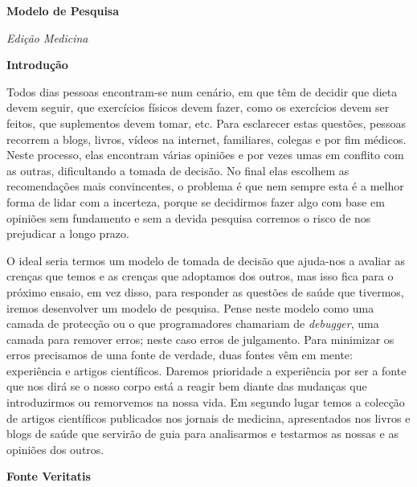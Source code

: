 \documentclass[12pt]{article}
\begin{document}
 

\begin{titlepage}
    \begin{center}
        \Huge\textbf{Modelo de Pesquisa}
         
        \Large\textit{Edi\c c\~ao Medicina}
         
        \vspace{10cm}
    \end{center}
\end{titlepage}

\begin{center}
    \Huge\textbf{Introdu\c c\~ao}
\end{center}

\justifying
Todos dias pessoas encontram-se num cen\'ario, em que t\^em de decidir que
dieta devem seguir, que exerc\'icios f\'isicos devem fazer, como os
exerc\'icios devem ser
feitos,  que suplementos
devem tomar, etc. Para esclarecer estas quest\~oes, pessoas recorrem a blogs,
livros, v\'ideos na internet, familiares, colegas e por fim  m\'edicos. Neste
processo, elas encontram v\'arias
opini\~oes e por vezes umas em conflito com as outras, dificultando a tomada
de decis\~ao. 
No final elas escolhem as recomenda\c c\~oes mais
convincentes, o problema \'e que nem sempre esta \'e a melhor forma de lidar
com a incerteza, porque se decidirmos fazer algo com base em opini\~oes
sem fundamento e sem a devida pesquisa corremos o risco de nos prejudicar a longo prazo. 

O ideal seria termos um modelo de tomada de decis\~ao que ajuda-nos a avaliar as
cren\c cas que temos e as cren\c cas que adoptamos dos outros, mas isso fica
para o pr\'oximo ensaio, em vez disso, para responder as quest\~oes de sa\'ude que
tivermos, iremos desenvolver um modelo de pesquisa.  
Pense neste modelo como  uma camada de protec\c c\~ao ou o que programadores chamariam de \textit{debugger}, uma camada para remover erros; neste caso erros de julgamento.  
Para minimizar os erros precisamos de uma fonte de verdade, duas fontes v\^em
em mente: experi\^encia e artigos cient\'ificos. Daremos prioridade a
experi\^encia por ser a fonte que nos dir\'a se o nosso corpo est\'a a reagir
bem diante das mudan\c cas que introduzirmos ou remorvemos na nossa
vida. Em segundo lugar temos a colec\c c\~ao de artigos cient\'ificos
publicados nos jornais de medicina, apresentados nos livros e blogs de sa\'ude que servir\~ao de
guia para analisarmos e testarmos as nossas e as opini\~oes dos outros. 
\pagebreak


\begin{center}
    \Huge\textbf{Fonte Veritatis}
\end{center}
\end{document}
